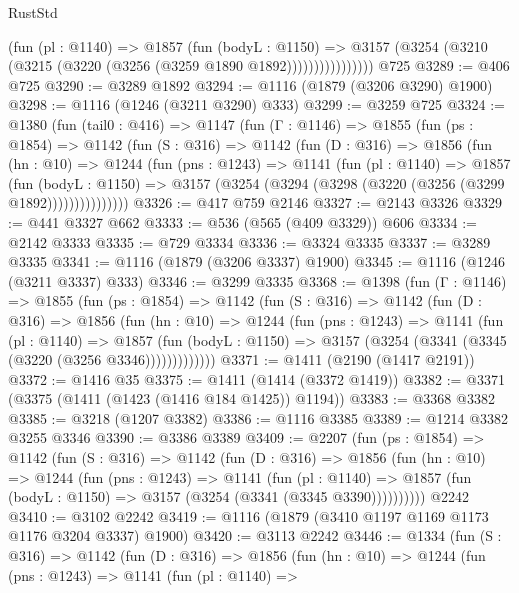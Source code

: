 \begin{lexlean}{RustStd}
\begin{coremodule}
{\begin{coremodule}
{{{{{{{{{{{                    (fun (pl : @1140) =>
                    @1857
                      (fun (bodyL : @1150) =>
                      @3157 (@3254 (@3210 (@3215 (@3220 (@3256 (@3259 @1890 @1892))))))))))))))))
    @725
@3289 := @406 @725
@3290 := @3289 @1892
@3294 := @1116 (@1879 (@3206 @3290) @1900)
@3298 := @1116 (@1246 (@3211 @3290) @333)
@3299 := @3259 @725
@3324 := @1380
    (fun (tail0 : @416) =>
    @1147
      (fun (Γ : @1146) =>
      @1855
        (fun (ps : @1854) =>
        @1142
          (fun (S : @316) =>
          @1142
            (fun (D : @316) =>
            @1856
              (fun (hn : @10) =>
              @1244
                (fun (pns : @1243) =>
                @1141
                  (fun (pl : @1140) =>
                  @1857
                    (fun (bodyL : @1150) =>
                    @3157 (@3254 (@3294 (@3298 (@3220 (@3256 (@3299 @1892)))))))))))))))
@3326 := @417 @759 @2146
@3327 := @2143 @3326
@3329 := @441 @3327 @662
@3333 := @536 (@565 (@409 @3329)) @606
@3334 := @2142 @3333
@3335 := @729 @3334
@3336 := @3324 @3335
@3337 := @3289 @3335
@3341 := @1116 (@1879 (@3206 @3337) @1900)
@3345 := @1116 (@1246 (@3211 @3337) @333)
@3346 := @3299 @3335
@3368 := @1398
    (fun (Γ : @1146) =>
    @1855
      (fun (ps : @1854) =>
      @1142
        (fun (S : @316) =>
        @1142
          (fun (D : @316) =>
          @1856
            (fun (hn : @10) =>
            @1244
              (fun (pns : @1243) =>
              @1141
                (fun (pl : @1140) =>
                @1857
                  (fun (bodyL : @1150) =>
                  @3157 (@3254 (@3341 (@3345 (@3220 (@3256 @3346)))))))))))))
@3371 := @1411 (@2190 (@1417 @2191))
@3372 := @1416 @35
@3375 := @1411 (@1414 (@3372 @1419))
@3382 := @3371 (@3375 (@1411 (@1423 (@1416 @184 @1425)) @1194))
@3383 := @3368 @3382
@3385 := @3218 (@1207 @3382)
@3386 := @1116 @3385
@3389 := @1214 @3382 @3255 @3346
@3390 := @3386 @3389
@3409 := @2207
    (fun (ps : @1854) =>
    @1142
      (fun (S : @316) =>
      @1142
        (fun (D : @316) =>
        @1856
          (fun (hn : @10) =>
          @1244
            (fun (pns : @1243) =>
            @1141
              (fun (pl : @1140) =>
              @1857 (fun (bodyL : @1150) => @3157 (@3254 (@3341 (@3345 @3390))))))))))
    @2242
@3410 := @3102 @2242
@3419 := @1116 (@1879 (@3410 @1197 @1169 @1173 @1176 @3204 @3337) @1900)
@3420 := @3113 @2242
@3446 := @1334
    (fun (S : @316) =>
    @1142
      (fun (D : @316) =>
      @1856
        (fun (hn : @10) =>
        @1244
          (fun (pns : @1243) =>
          @1141
            (fun (pl : @1140) =>
}}}}}}}}}}}
\end{coremodule}}
\end{coremodule}
\end{lexlean}
